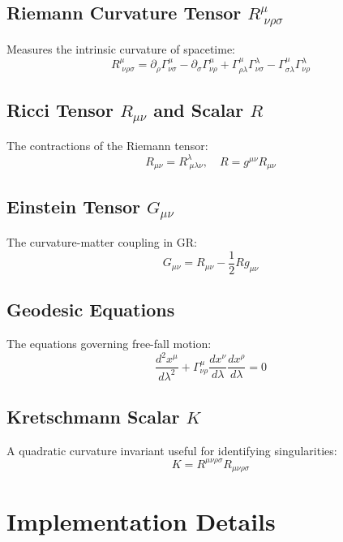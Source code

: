 \documentclass[11pt,a4paper]{article}
\begin{document}
\subsection{Riemann Curvature Tensor $R^{\mu}_{\;\nu\rho\sigma}$}
Measures the intrinsic curvature of spacetime:
\begin{equation}
R^{\mu}_{\;\nu\rho\sigma} = \partial_\rho \Gamma^{\mu}_{\nu\sigma} - \partial_\sigma \Gamma^{\mu}_{\nu\rho} + \Gamma^{\mu}_{\rho\lambda} \Gamma^{\lambda}_{\nu\sigma} - \Gamma^{\mu}_{\sigma\lambda} \Gamma^{\lambda}_{\nu\rho}
\end{equation}

\subsection{Ricci Tensor $R_{\mu\nu}$ and Scalar $R$}
The contractions of the Riemann tensor:
\begin{equation}
R_{\mu\nu} = R^{\lambda}_{\;\mu\lambda\nu}, \quad R = g^{\mu\nu} R_{\mu\nu}
\end{equation}

\subsection{Einstein Tensor $G_{\mu\nu}$}
The curvature-matter coupling in GR:
\begin{equation}
G_{\mu\nu} = R_{\mu\nu} - \frac{1}{2} R g_{\mu\nu}
\end{equation}

\subsection{Geodesic Equations}
The equations governing free-fall motion:
\begin{equation}
\frac{d^2 x^\mu}{d\lambda^2} + \Gamma^{\mu}_{\nu\rho} \frac{dx^\nu}{d\lambda} \frac{dx^\rho}{d\lambda} = 0
\end{equation}

\subsection{Kretschmann Scalar $K$}
A quadratic curvature invariant useful for identifying singularities:
\begin{equation}
K = R^{\mu\nu\rho\sigma} R_{\mu\nu\rho\sigma}
\end{equation}

\section{Implementation Details}
\end{document}
